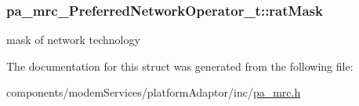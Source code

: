 \subsubsection[{\texorpdfstring{rat\+Mask}{ratMask}}]{ pa\+\_\+mrc\+\_\+\+Preferred\+Network\+Operator\+\_\+t\+::rat\+Mask}\hypertarget{structpa__mrc___preferred_network_operator__t_abc5904f992fb84a3d3fc6d31bba9f298}{}\label{structpa__mrc___preferred_network_operator__t_abc5904f992fb84a3d3fc6d31bba9f298}


mask of network technology 



The documentation for this struct was generated from the following file\+:\begin{DoxyCompactItemize}
\item 
components/modem\+Services/platform\+Adaptor/inc/\hyperlink{pa__mrc_8h}{pa\+\_\+mrc.\+h}\end{DoxyCompactItemize}
